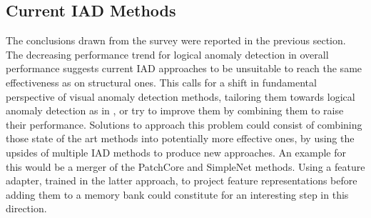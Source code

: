 \subsection{Current IAD Methods}
The conclusions drawn from the survey were reported in the previous section. The decreasing performance trend for logical anomaly detection in overall performance suggests 
current IAD approaches to be unsuitable to reach the same effectiveness as on structural ones. This calls for a shift in fundamental perspective of visual anomaly 
detection methods, tailoring them towards logical anomaly detection as in \cite{LOCODentsAndScratchesBergmann2022}, or try to improve them by combining them to raise their 
performance. Solutions to approach this problem could consist of combining 
those state of the art methods into potentially more effective ones, by using the upsides of multiple IAD methods to produce new approaches. An example for this would be a 
merger of the PatchCore \cite{patchCore2022} and SimpleNet \cite{liu2023simplenet} methods. Using a feature adapter, trained in the latter approach, to project feature 
representations before adding them to a memory bank could constitute for an interesting step in this direction. 


